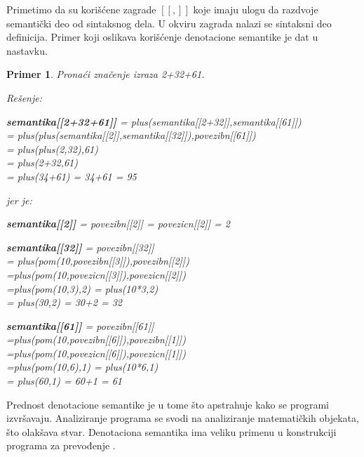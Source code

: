 \documentclass[a4paper]{article}
\newtheorem{primer}{Primer}[section]
\begin{document}
Primetimo da su korišćene zagrade $ [[,]]$ koje imaju ulogu da razdvoje semantički deo od sintaksnog dela. U okviru zagrada nalazi se sintaksni deo definicija. Primer koji oslikava korišćenje denotacione semantike je dat u nastavku.
\begin{primer}
Pronaći značenje izraza 2+32+61.

Rešenje:
\begin{center}
\textbf{semantika[[2+32+61]]} = plus(semantika[[2+32]],semantika[[61]])\\
= plus(plus(semantika[[2]],semantika[[32]]),povezibn[[61]])\\
= plus(plus(2,32),61)\\
= plus(2+32,61)\\
= plus(34+61) = 34+61 = 95
\end{center}

jer je:

\begin{center}
\textbf{semantika[[2]]} = povezibn[[2]] = povezicn[[2]] = 2
\end{center}
\begin{center}
\textbf{semantika[[32]]} = povezibn[[32]]\\
= plus(pom(10,povezibn[[3]]),povezibn[[2]])\\
=plus(pom(10,povezicn[[3]]),povezicn[[2]]) \\
=plus(pom(10,3),2) = plus(10*3,2)\\
= plus(30,2) = 30+2 = 32\end{center}

\begin{center}
\textbf{semantika[[61]]} = povezibn[[61]] \\
=plus(pom(10,povezibn[[6]]),povezibn[[1]])\\
=plus(pom(10,povezicn[[6]]),povezicn[[1]]) \\
=plus(pom(10,6),1) = plus(10*6,1)\\
= plus(60,1) = 60+1 = 61

\end{center}
\end{primer}

 Prednost denotacione semantike je u tome što apstrahuje kako se programi izvršavaju. Analiziranje programa se svodi na analiziranje matematičkih objekata, što olakšava stvar. Denotaciona semantika ima veliku primenu u konstrukciji programa za prevođenje \cite{parezanovic}.
\end{document}
